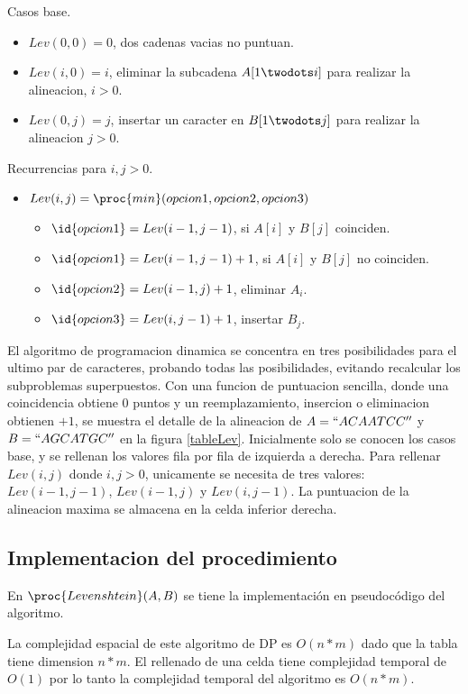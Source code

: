 \noindent Casos base.
\begin{itemize}
  \item $Lev(0,0) = 0$, dos cadenas vacias no puntuan.
  \item $Lev(i,0) = i$, eliminar la subcadena $A[1 \twodots i]$ para realizar la alineacion, $i>0$.
  \item $Lev(0,j) = j$, insertar un caracter en $B[1 \twodots j]$ para realizar la alineacion $j>0$.
\end{itemize}
\noindent Recurrencias para $i, j > 0$.
\begin{itemize}
  \item $Lev(i,j) = \proc{min}(opcion1, opcion2, opcion3)$
  \begin{itemize}
    \item $\id{opcion1} = Lev(i-1,j-1)$, si $A[i]$ y $B[j]$ coinciden.
    \item $\id{opcion1} = Lev(i-1,j-1) + 1$, si $A[i]$ y $B[j]$ no coinciden.
    \item $\id{opcion2} = Lev(i-1,j) + 1$, eliminar $A_i$.
    \item $\id{opcion3} = Lev(i,j - 1) + 1$, insertar $B_j$.
  \end{itemize}
\end{itemize}

El algoritmo de programacion dinamica se concentra en tres posibilidades para el ultimo par de caracteres, probando todas las posibilidades, evitando recalcular los subproblemas superpuestos. Con una funcion de puntuacion sencilla, donde una coincidencia obtiene $0$ puntos y un reemplazamiento, insercion o eliminacion obtienen $+1$, se muestra el detalle de la alineacion de $A=``ACAATCC''$ y $B=``AGCATGC''$ en la figura \ref{tableLev}. Inicialmente solo se conocen los casos base, y se rellenan los valores fila por fila de izquierda a derecha. Para rellenar $Lev(i,j)$ donde $i , j > 0$, unicamente se necesita de tres valores: $Lev(i-1,j-1)$, $Lev(i-1,j)$ y $Lev(i,j-1)$. La puntuacion de la alineacion maxima se almacena en la celda inferior derecha.


\subsection{Implementacion del procedimiento}
En $\proc{Levenshtein}(A,B)$ se tiene la implementación en pseudocódigo del algoritmo.

La complejidad espacial de este algoritmo de DP es $O(n * m)$ dado que la tabla tiene dimension $n * m$. El rellenado de una celda tiene complejidad temporal de $O(1)$ por lo tanto la complejidad temporal del algoritmo es $O(n * m)$.

